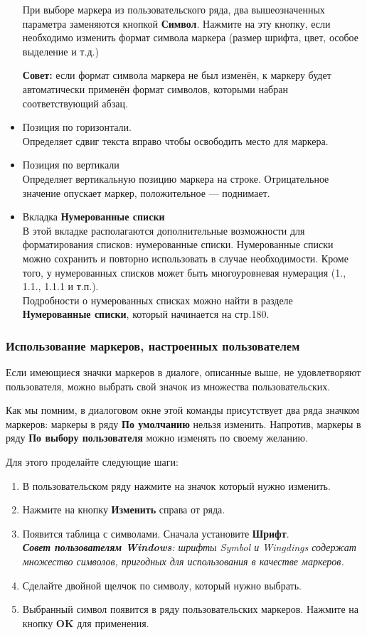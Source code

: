 \documentclass[a4paper,10pt]{article}
\begin{document}
\begin{itemize}
При выборе маркера из пользовательского ряда, два вышеозначенных параметра заменяются кнопкой \textbf{Символ}. Нажмите на эту кнопку, если необходимо изменить формат символа маркера (размер шрифта, цвет, особое выделение и т.д.)
\begin{mdframed}[backgroundcolor=blue!10]
\textbf{Совет:} если формат символа маркера не был изменён, к маркеру будет автоматически применён формат символов, которыми набран соответствующий абзац.
\end{mdframed}
\item Позиция по горизонтали.\\
Определяет сдвиг текста вправо чтобы освободить место для маркера.
\item Позиция по вертикали\\
Определяет вертикальную позицию маркера на строке. Отрицательное значение опускает маркер, положительное --- поднимает.
\item Вкладка \textbf{Нумерованные списки}\\
В этой вкладке располагаются дополнительные возможности для форматирования списков: нумерованные списки. Нумерованные списки можно сохранить и повторно использовать в случае необходимости. Кроме того, у нумерованных списков может быть многоуровневая нумерация (1., 1.1., 1.1.1 и т.п.).\\
Подробности о нумерованных списках можно найти в разделе \textbf{Нумерованные списки}, который начинается на стр.180.
\end{itemize}

\subsubsection{Использование маркеров, настроенных пользователем}
Если имеющиеся значки маркеров в диалоге, описанные выше, не удовлетворяют пользователя, можно выбрать свой значок из множества пользовательских.

Как мы помним, в диалоговом окне этой команды присутствует два ряда значком маркеров: маркеры в ряду \textbf{По умолчанию} нельзя изменить. Напротив, маркеры в ряду \textbf{По выбору пользователя} можно изменять по своему желанию.

Для этого проделайте следующие шаги:
\begin{enumerate}
 \item В пользовательском ряду нажмите на значок который нужно изменить.
 \item Нажмите на кнопку \textbf{Изменить} справа от ряда.
 \item Появится таблица с символами. Сначала установите \textbf{Шрифт}.\\
 {\footnotesize \textit{\textbf{Совет пользователям Windows}: шрифты Symbol и Wingdings содержат множество символов, пригодных для использования в качестве маркеров.}}
 \item Сделайте двойной щелчок по символу, который нужно выбрать.
 \item Выбранный символ появится в ряду пользовательских маркеров. Нажмите на кнопку \textbf{OK} для применения.
\end{enumerate}
\end{document}

